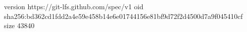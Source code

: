 version https://git-lfs.github.com/spec/v1
oid sha256:bd362cd1fdd2a4e59e458b14e6e01744156e81bf9d72f2d4500d7a9f045410cf
size 43840
